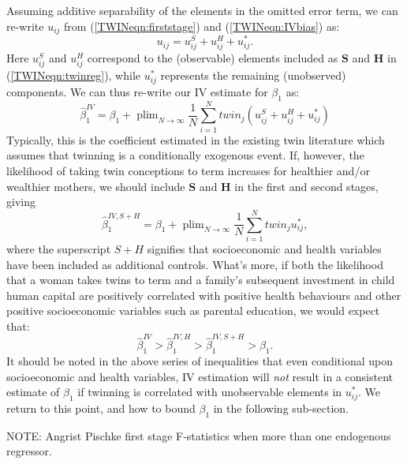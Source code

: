 \documentclass[subeqn]{article}
\DeclareMathOperator{\plim}{plim}
\begin{document}
\begin{spacing}{1.4}
Assuming additive separability of the elements in the omitted error term, we can 
re-write $u_{ij}$ from (\ref{TWINeqn:firststage}) and (\ref{TWINeqn:IVbias}) as:
\[ u_{ij}=u^S_{ij}+u^H_{ij}+u^*_{ij}. \]
Here $u^S_{ij}$ and $u^H_{ij}$ correspond to the (observable) elements included 
as $\bm{S}$ and $\bm{H}$ in (\ref{TWINeqn:twinreg}), while $u^*_{ij}$ represents 
the remaining (unobserved) components.  We can thus re-write our IV estimate for 
$\beta_1$ as:
\begin{equation}
\label{TWINeqn:betabias}
\hat\beta_1^{IV} = \beta_1 + 
\plim_{N\to \infty} \frac{1}{N}\sum_{i=1}^N twin_j(u^S_{ij}+u^H_{ij}+u^*_{ij})
\end{equation}
Typically, this is the coefficient estimated in the existing twin literature 
which assumes that twinning is a conditionally exogenous event.  If, however, the 
likelihood of taking twin conceptions to term increases for healthier and/or 
wealthier mothers, we should include $\bm{S}$ and $\bm{H}$ in the first and 
second stages, giving
\begin{equation}
\label{TWINeqn:betacloser}
\hat\beta_1^{IV,S+H} = \beta_1 +
\plim_{N\to \infty} \frac{1}{N}\sum_{i=1}^N twin_ju^*_{ij},
\end{equation}
where the superscript $S+H$ signifies that socioeconomic and health variables 
have been included as additional controls.  What's more, if both the likelihood
that a woman takes twins to term and a family's subsequent investment in child 
human capital are positively correlated with positive health behaviours and other 
positive socioeconomic variables such as parental education, we would expect that:
\begin{equation}
\label{TWINeqn:moves}
\hat\beta_1^{IV}>\hat\beta_1^{IV,H}>\hat\beta_1^{IV,S+H}>\beta_1.
\end{equation}
It should be noted in the above series of inequalities that even conditional upon
socioeconomic and health variables, IV estimation will \emph{not} result in a
consistent estimate of $\beta_1$ if twinning is correlated with unobservable
elements in $u^*_{ij}$.  We return to this point, and how to bound $\beta_1$ in
the following sub-section.

NOTE: Angrist Pischke first stage F-statistics when more than one endogenous
regressor.


\end{spacing}
\end{document}
